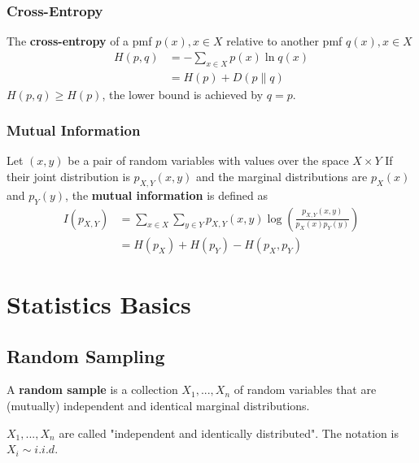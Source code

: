 \documentclass[11pt]{elegantbook}
\begin{document}
\subsection{Cross-Entropy}
\begin{definition}
    The \textbf{cross-entropy} of a pmf $p(x),x\in X$ relative to another pmf $q(x), x\in X$
    \begin{equation}
        \begin{aligned}
            H(p, q)&=-\sum_{x\in X}p(x)\ln q(x)\\&=H(p)+D(p\| q)
        \end{aligned}
        \nonumber
    \end{equation}
    $H(p,q)\geq H(p)$, the lower bound is achieved by $q=p$.
\end{definition}

\subsection{Mutual Information}
\begin{definition}
    Let $(x,y)$ be a pair of random variables with values over the space $X\times Y$ If their joint distribution is $p_{X,Y}(x,y)$ and the marginal distributions are $p_X(x)$ and $p_Y(y)$, the \textbf{mutual information} is defined as
    \begin{equation}
        \begin{aligned}
            I(p_{X,Y})&=\sum_{x\in X}\sum_{y\in Y}p_{X,Y}(x,y)\log\left(\frac{p_{X,Y}(x,y)}{p_X(x)p_Y(y)}\right)\\
            &=H(p_X)+H(p_Y)-H(p_X,p_Y)
        \end{aligned}
        \nonumber
    \end{equation}
\end{definition}


\chapter{Statistics Basics}
\section{Random Sampling}
\begin{definition}
    \normalfont
    A \textbf{random sample} is a collection $X_1,...,X_n$ of random variables that are (mutually) independent and identical marginal distributions.

    $X_1,...,X_n$ are called "independent and identically distributed". The notation is $X_i\sim i.i.d. $
\end{definition}
\end{document}

